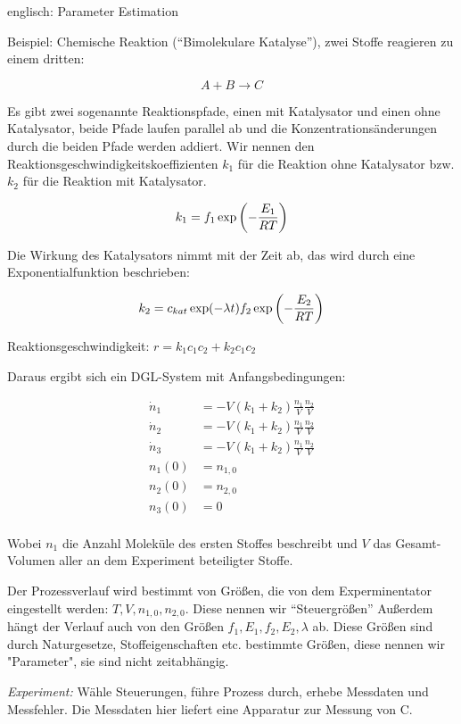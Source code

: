 
englisch: Parameter Estimation

Beispiel: Chemische Reaktion ("`Bimolekulare Katalyse"'), zwei Stoffe reagieren zu einem dritten:

\[A+B \to C\]

Es gibt zwei sogenannte Reaktionspfade, einen mit Katalysator und einen ohne Katalysator, beide Pfade laufen parallel ab und die Konzentrationsänderungen durch die beiden Pfade werden addiert. Wir nennen den Reaktionsgeschwindigkeitskoeffizienten $k_1$ für die Reaktion ohne Katalysator bzw. $k_2$ für die Reaktion mit Katalysator.

\[k_1 = f_1 \exp\left(-\frac{E_1}{RT}\right)\]

Die Wirkung des Katalysators nimmt mit der Zeit ab, das wird durch eine Exponentialfunktion beschrieben:

\[k_2 = c_{kat} \exp(-\lambda t) f_2 \exp\left(-\frac{E_2}{RT}\right)\]

Reaktionsgeschwindigkeit: $r= k_1 c_1 c_2 + k_2 c_1 c_2$

Daraus ergibt sich ein DGL-System mit Anfangsbedingungen:

\begin{align*}
\dot n_1 &= -V(k_1+k_2) \frac{n_1}V \frac{n_2}V \\
\dot n_2 &= -V(k_1+k_2) \frac{n_1}V \frac{n_2}V \\
\dot n_3 &= -V(k_1+k_2) \frac{n_1}V \frac{n_2}V \\
n_1(0) &= n_{1,0} \\
n_2(0) &= n_{2,0} \\
n_3(0) &= 0 \\
\end{align*}

Wobei $n_1$ die Anzahl Moleküle des ersten Stoffes beschreibt und $V$ das Gesamt-Volumen aller an dem Experiment beteiligter Stoffe.


Der Prozessverlauf wird bestimmt von Größen, die von dem Experminentator eingestellt werden: $T,V,n_{1,0},n_{2,0}$. Diese nennen wir "`Steuergrößen"'
Außerdem hängt der Verlauf auch von den Größen $f_1,E_1,f_2,E_2,\lambda$ ab. Diese Größen sind durch Naturgesetze, Stoffeigenschaften etc. bestimmte Größen, diese nennen wir "Parameter", sie sind nicht zeitabhängig.

\emph{Experiment:} Wähle Steuerungen, führe Prozess durch, erhebe Messdaten und Messfehler. Die Messdaten hier liefert eine Apparatur zur Messung von C.

